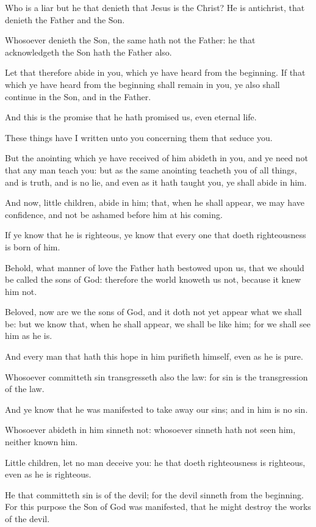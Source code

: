 \Verse Who is a liar but he that denieth that Jesus is the Christ? He is antichrist, that denieth the Father and the Son.

\Verse Whosoever denieth the Son, the same hath not the Father: he that acknowledgeth the Son hath the Father also.

\Verse Let that therefore abide in you, which ye have heard from the beginning. If that which ye have heard from the beginning shall remain in you, ye also shall continue in the Son, and in the Father.

\Verse And this is the promise that he hath promised us, even eternal life.

\Verse These things have I written unto you concerning them that seduce you.

\Verse But the anointing which ye have received of him abideth in you, and ye need not that any man teach you: but as the same anointing teacheth you of all things, and is truth, and is no lie, and even as it hath taught you, ye shall abide in him.

\Verse And now, little children, abide in him; that, when he shall appear, we may have confidence, and not be ashamed before him at his coming.

\Verse If ye know that he is righteous, ye know that every one that doeth righteousness is born of him.


\Chapter
\Verse Behold, what manner of love the Father hath bestowed upon us, that we should be called the sons of God: therefore the world knoweth us not, because it knew him not.

\Verse Beloved, now are we the sons of God, and it doth not yet appear what we shall be: but we know that, when he shall appear, we shall be like him; for we shall see him as he is.

\Verse And every man that hath this hope in him purifieth himself, even as he is pure.

\Verse Whosoever committeth sin transgresseth also the law: for sin is the transgression of the law.

\Verse And ye know that he was manifested to take away our sins; and in him is no sin.

\Verse Whosoever abideth in him sinneth not: whosoever sinneth hath not seen him, neither known him.

\Verse Little children, let no man deceive you: he that doeth righteousness is righteous, even as he is righteous.

\Verse He that committeth sin is of the devil; for the devil sinneth from the beginning. For this purpose the Son of God was manifested, that he might destroy the works of the devil.

